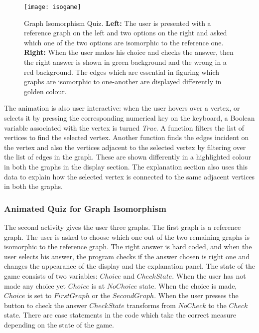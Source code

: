 \begin{figure}[h]
\centering
\texttt{[image: isogame]}
\caption{
         Graph Isomorphism Quiz. 
         \textbf{Left:} The user is presented with a reference graph on the left and two
         options on the right and asked which one of the two options are
         isomorphic to the reference one.
         \textbf{Right:} When the user makes his choice and checks the answer,
         then the right answer is shown in green background and the wrong in a red background.
         The edges which are essential in figuring which graphs are isomorphic to one-another
         are displayed differently in golden colour.
        }
\label{animationfigure: isomorphicGame}
\end{figure}
The animation is also user interactive: when the user hovers over a vertex, or
selects it by pressing the corresponding numerical key on the keyboard, a
Boolean variable associated with the vertex is turned \emph{True}. A function
filters the list of vertices to find the selected vertex. Another function
finds the edges incident on the vertex and also the vertices adjacent to the
selected vertex by filtering over the list of edges in the graph. These are
shown differently in a highlighted colour in both the graphs in the display
section.  The explanation section also uses this data to explain how the
selected vertex is connected to the same adjacent vertices in both the graphs.

\subsubsection{Animated Quiz for Graph Isomorphism}
The second activity gives the user three graphs. The first graph is a reference
graph. The user is asked to choose which one out of the two remaining graphs is
isomorphic to the reference graph. The right answer is hard coded, and when the
user selects his answer, the program checks if the answer chosen is right one
and changes the appearance of the display and the explanation panel.  The
state of the game consists of two variables: $Choice$ and $CheckState$.  When
the user has not made any choice yet $Choice$ is at $NoChoice$ state.  When the
choice is made, $Choice$ is set to $FirstGraph$ or the $SecondGraph$.  When the
user presses the button to check the answer $CheckState$ transforms from
$NoCheck$ to the $Check$ state.  There are case statements in the code which
take the correct measure depending on the state of the game.

